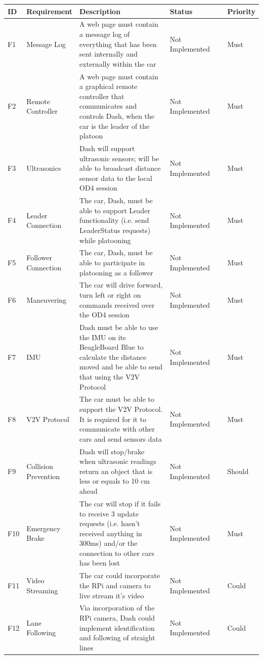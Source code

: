 \documentclass[12pt]{article}
\begin{document}
\begin{longtable}{| p{0.05\linewidth} | p{0.15\linewidth} | p{0.45\linewidth} | p{0.25\linewidth} | p{0.1\linewidth} |}\hline 
    ID & Requirement & Description & Status & Priority \\ \hline
   	F1 & Message Log & A web page must contain a message log of everything that has been sent internally and externally within the car & Not Implemented & Must\\ \hline
   	F2 & Remote Controller & A web page must contain a graphical remote controller that communicates and controls Dash, when the car is the leader of the platoon & Not Implemented & Must\\ \hline
   	F3 & Ultrasonics & Dash will support ultrasonic sensors; will be able to broadcast distance sensor data to the local OD4 session & Not Implemented & Must\\ \hline
   	F4 & Leader Connection & The car, Dash, must be able to support Leader functionality (i.e. send LeaderStatus requests) while platooning & Not Implemented & Must\\ \hline       
    F5 & Follower Connection & The car, Dash, must be able to participate in platooning as a follower & Not Implemented & Must\\ \hline
    F6 & Maneuvering & The car will drive forward, turn left or right on commands received over the OD4 session & Not Implemented & Must\\ \hline
   	F7 & IMU & Dash must be able to use the IMU on its BeagleBoard Blue to calculate the distance moved and be able to send that using the V2V Protocol & Not Implemented & Must\\ \hline
   	F8 & V2V Protocol & The car must be able to support the V2V Protocol. It is required for it to communicate with other cars and send sensors data & Not Implemented & Must\\ \hline
   	F9 & Collision Prevention & Dash will stop/brake when ultrasonic readings return an object that is less or equals to 10 cm ahead & Not Implemented & Should\\ \hline
   	F10 & Emergency Brake & The car will stop if it fails to receive 3 update requests (i.e. hasn’t received anything in 300ms) and/or the connection to other cars has been lost & Not Implemented & Must\\ \hline
   	F11 & Video Streaming& The car could incorporate the RPi and camera to live stream it’s video & Not Implemented & Could\\ \hline
  	F12 & Lane Following & Via incorporation of the RPi camera, Dash could implement identification and following of straight lines & Not Implemented & Could\\ \hline
\end{longtable}
\end{document}
